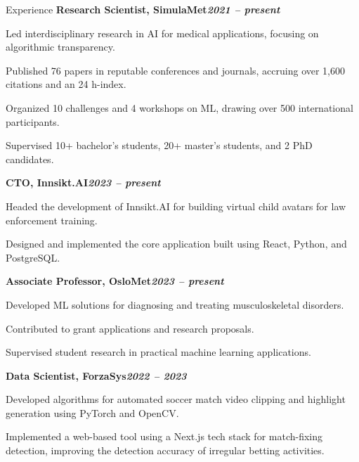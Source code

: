 \begin{rubric}{Experience}
%
\entry*[]%
\textbf{Research Scientist, SimulaMet\hfill\textit{2021 -- present}} \par
\begin{compactitem}
    \item Led interdisciplinary research in AI for medical applications, focusing on algorithmic transparency.
    \item Published 76 papers in reputable conferences and journals, accruing over 1,600 citations and an 24 h-index.
    \item Organized 10 challenges and 4 workshops on ML, drawing over 500 international participants.
    \item Supervised 10+ bachelor's students, 20+ master's students, and 2 PhD candidates.
    \vspace{-12pt}
\end{compactitem}
%
\entry*[]%
\textbf{CTO, Innsikt.AI\hfill\textit{2023 -- present}} \par
\begin{compactitem}
    \item Headed the development of Innsikt.AI for building virtual child avatars for law enforcement training.
    \item Designed and implemented the core application built using React, Python, and PostgreSQL.
    \vspace{-12pt}
\end{compactitem}
%
\entry*[]%
\textbf{Associate Professor, OsloMet\hfill\textit{2023 -- present}} \par
\begin{compactitem}
    \item Developed ML solutions for diagnosing and treating musculoskeletal disorders.
    \item Contributed to grant applications and research proposals.
    \item Supervised student research in practical machine learning applications.
    \vspace{-12pt}
\end{compactitem}
%
\entry*[]%
\textbf{Data Scientist, ForzaSys\hfill\textit{2022 -- 2023}} \par
\begin{compactitem}
    \item Developed algorithms for automated soccer match video clipping and highlight generation using PyTorch and OpenCV.
    \item Implemented a web-based tool using a Next.js tech stack for match-fixing detection, improving the detection accuracy of irregular betting activities.

\end{compactitem}
\end{rubric}
